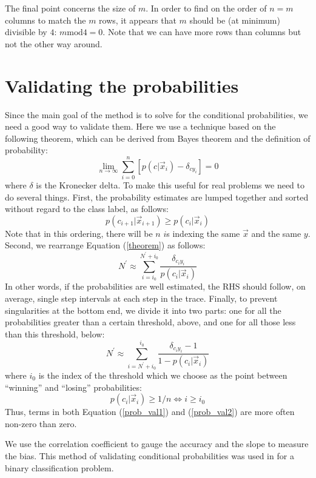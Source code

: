 The final point concerns the size of $m$. In order to find on the order
of $n=m$ columns to match the $m$ rows, it appears that $m$ should be 
(at minimum) divisible by $4$: $m \mathrm{mod} 4 = 0$.
Note that we can have more rows than columns but not the other way around.

\section{Validating the probabilities}

Since the main goal of the method 
is to solve for the conditional probabilities, 
we need a good way to validate them. 
Here we use a technique based on the
following theorem, which can be derived from Bayes theorem and the 
definition of probability:
\begin{equation}
	\lim_{n \rightarrow \infty} \sum_{i=0}^{n} \left [
	p(c | \vec x_i) - \delta_{cy_i} \right ] = 0
	\label{theorem}
\end{equation}
where $\delta$ is the Kronecker delta.
To make this useful for real problems we need to do several things.
First, the probability estimates are lumped together and sorted without regard
to the class label, as follows:
\begin{equation}
	p(c_{i+1} | \vec x_{i+1}) \ge p(c_i | \vec x_i)
\end{equation}
Note that in this ordering, there will be $n$ $i$s indexing the same $\vec x$ 
and the same $y$.
Second, we rearrange Equation (\ref{theorem}) as follows:
\begin{equation}
	N^\prime \approx \sum_{i=i_0}^{N^\prime+i_0} \frac{\delta_{c_i y_i}}{p(c_i | \vec x_i)}
	\label{prob_val1}
\end{equation}
In other words, if the probabilities are well estimated, the RHS should
follow, on average, single step intervals at each step in the trace.
Finally, to prevent singularities at the bottom end, 
we divide it into two parts:
one for all the probabilities greater than a certain threshold, above, 
and one for all those less than this threshold, below:
\begin{equation}
	N^\prime  \approx \sum_{i=N^\prime+i_0}^{i_0} \frac{\delta_{c_i y_i} - 1}{1 - p(c_i | \vec x_i)}
	\label{prob_val2}
\end{equation}
where $i_0$ is the index of the threshold which we choose as the
point between ``winning'' and ``losing'' probabilities:
\begin{equation}
	p(c_i | \vec x_i) \ge 1/n \iff i \ge i_0
\end{equation}
Thus, terms in both Equation (\ref{prob_val1}) and (\ref{prob_val2}) are more
often non-zero than zero.

We use the correlation coefficient to gauge the accuracy and the slope to
measure the bias.
This method of validating conditional probabilities was used in
\citet{Mills2009} for a binary classification problem.


